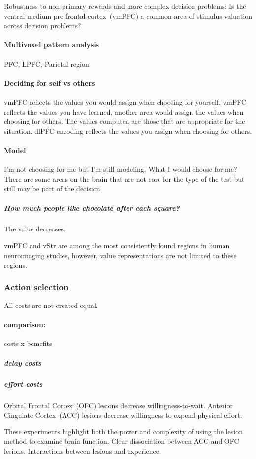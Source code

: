 \documentclass[12pt,article,oneside,a4paper]{memoir}
\begin{document}
Robustness to non-primary rewards and more complex decision problems: Is the
ventral medium pre frontal cortex~(vmPFC) a common area of stimulus valuation
across decision problems?

\paragraph{Multivoxel pattern analysis} PFC, LPFC, Parietal region

\paragraph{Deciding for self vs others}
vmPFC reflects the values you would assign when choosing for yourself.
vmPFC reflects the values you have learned, another area would assign the
values when choosing for others. The values computed are those that are
appropriate for the situation. dlPFC encoding reflects the values you assign
when choosing for others.

\paragraph{Model}
I'm not choosing for me but I'm still modeling. What I would choose for me?
There are some areas on the brain that are not core for the type of the test but
still may be part of the decision.

\subparagraph{How much people like chocolate after each square?}
The value decreases.

vmPFC and vStr are among the most consistently found regions in human
neuroimaging studies, however, value representations are not limited to these
regions.

\subsubsection{Action selection}
All costs are not created equal.

\paragraph{comparison:} costs x bemefits
\subparagraph{delay costs}
\subparagraph{effort costs}

Orbital Frontal Cortex~(OFC) lesions decrease willingness-to-wait. Anterior
Cingulate Cortex~(ACC) lesions decrease willingness to expend physical effort.

These experiments highlight both the power and complexity of using the lesion
method to examine brain function. Clear dissociation between ACC and OFC
lesions. Interactions between lesions and experience.
\end{document}

